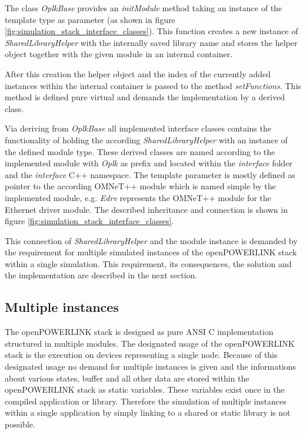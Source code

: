 The class \emph{OplkBase} provides an \emph{initModule} method taking an instance of the template type as parameter (as shown in figure \ref{fig:simulation_stack_interface_classes}).
This function creates a new instance of \emph{SharedLibraryHelper} with the internally saved library name and stores the helper object together with the given module in an internal container.

After this creation the helper object and the index of the currently added instances within the internal container is passed to the method \emph{setFunctions}.
This method is defined pure virtual and demands the implementation by a derived class.

Via deriving from \emph{OplkBase} all implemented interface classes contains the functionality of holding the according \emph{SharedLibraryHelper} with an instance of the defined module type.
These derived classes are named according to the implemented module with \emph{Oplk} as prefix and located within the \emph{interface} folder and the \emph{interface} C++ namespace.
The template parameter is mostly defined as pointer to the according OMNeT++ module which is named simple by the implemented module, e.g. \emph{Edrv} represents the OMNeT++ module for the Ethernet driver module.
The described inheritance and connection is shown in figure \ref{fig:simulation_stack_interface_classes}.

\begin{sloppypar}
This connection of \emph{SharedLibraryHelper} and the module instance is demanded by the requirement for multiple simulated instances of the openPOWERLINK stack within a single simulation.
This requirement, its consequences, the solution and the implementation are described in the next section.
\end{sloppypar}

\subsection{Multiple instances}
\label{sec:porting_stack_multiinstance}
\begin{sloppypar}
The openPOWERLINK stack is designed as pure ANSI C implementation structured in multiple modules.
The designated usage of the openPOWERLINK stack is the execution on devices representing a single node.
Because of this designated usage no demand for multiple instances is given and the informations about various states, buffer and all other data are stored within the openPOWERLINK stack as static variables.
These variables exist once in the compiled application or library.
Therefore the simulation of multiple instances within a single application by simply linking to a shared or static library is not possible.
\end{sloppypar}

